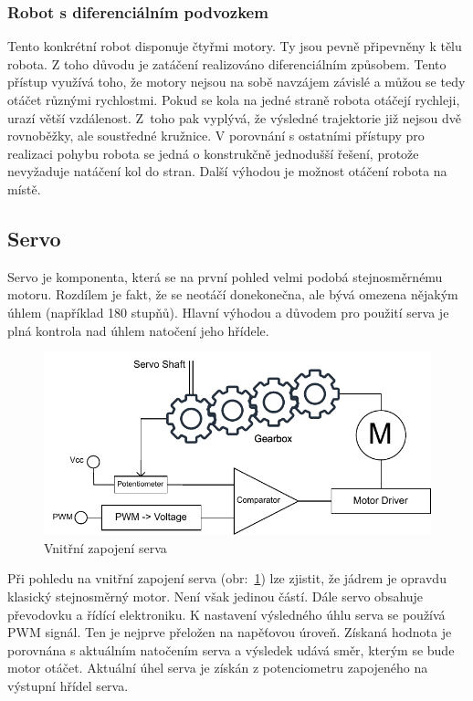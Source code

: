 \subsubsection{Robot s diferenciálním podvozkem}
Tento konkrétní robot disponuje čtyřmi motory. Ty jsou pevně připevněny k tělu robota. Z toho důvodu je zatáčení realizováno diferenciálním způsobem. Tento přístup využívá toho, že motory nejsou na sobě navzájem závislé a můžou se tedy otáčet různými rychlostmi. Pokud se kola na jedné straně robota otáčejí rychleji, urazí větší vzdálenost. Z~toho pak vyplývá, že výsledné trajektorie již nejsou dvě rovnoběžky, ale soustředné kružnice. V porovnání s ostatními přístupy pro realizaci pohybu robota se jedná o konstrukčně jednodušší řešení, protože nevyžaduje natáčení kol do stran. Další výhodou je možnost otáčení robota na místě. \cite[str:~5]{embeded_robotics}

\subsection*{Servo}
Servo je komponenta, která se na první pohled velmi podobá stejnosměrnému motoru. Rozdílem je fakt, že se neotáčí donekonečna, ale bývá omezena nějakým úhlem (například 180 stupňů). Hlavní výhodou a důvodem pro použití serva je plná kontrola nad úhlem natočení jeho hřídele. \cite[str:~119-121]{embeded_robotics}

\begin{figure}[h!]
	\centering
	\includegraphics[scale=0.9]{obrazky-figures/servo.pdf}
	\caption{Vnitřní zapojení serva}
	\label{fig:servo}
\end{figure}

Při pohledu na vnitřní zapojení serva (obr:~\ref{fig:servo}) lze zjistit, že jádrem je opravdu klasický stejnosměrný motor. Není však jedinou částí. Dále servo obsahuje převodovku a řídící elektroniku. K nastavení výsledného úhlu serva se používá PWM signál. Ten je nejprve přeložen na napěťovou úroveň. Získaná hodnota je porovnána s aktuálním natočením serva a výsledek udává směr, kterým se bude motor otáčet. Aktuální úhel serva je získán z potenciometru zapojeného na výstupní hřídel serva. \cite[str:~89-90]{mobilní_roboty}

